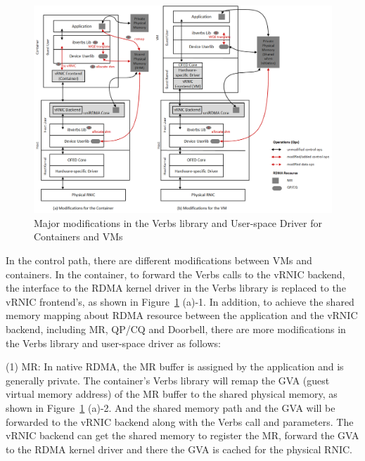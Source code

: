 \begin{figure}[!ht]
	\centering
	\includegraphics[width=0.8\linewidth]{images/verbs-driver}
	\caption{Major modifications in the Verbs library and User-space Driver for Containers and VMs}
	\label{fig:verbs-driver}
\end{figure}


In the control path, there are different modifications between VMs and containers. In the container, to forward the Verbs calls to the vRNIC backend, the interface to the RDMA kernel driver in the Verbs library is replaced to the vRNIC frontend's, as shown in Figure~\ref{fig:verbs-driver} (a)-1. In addition, to achieve the shared memory mapping about RDMA resource between the application and the vRNIC backend, including MR, QP/CQ and Doorbell, there are more modifications in the Verbs library and user-space driver as follows:

(1) MR: In native RDMA, the MR buffer is assigned by the application and is generally private. The container's Verbs library will remap the GVA (guest virtual memory address) of the MR buffer to the shared physical memory, as shown in Figure~\ref{fig:verbs-driver} (a)-2. And the shared memory path and the GVA will be forwarded to the vRNIC backend along with the Verbs call and parameters. The vRNIC backend can get the shared memory to register the MR, forward the GVA to the RDMA kernel driver and there the GVA is cached for the physical RNIC.

